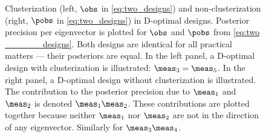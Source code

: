 \begin{figure}
  \caption{Clusterization (left, $\obs$ in \eqref{eq:two_designs})
    and non-clusterization (right, $\pobs$ in \eqref{eq:two_designs})
    in D-optimal designs. Posterior precision per eigenvector is
    plotted for $\obs$ and $\pobs$ from \eqref{eq:two
______designs}. Both designs are identical for all practical matters
    --- their posteriors are equal. In the left panel, a D-optimal
    design with clusterization is illustrated: $\meas_3 = \meas_5$. In
    the right panel, a D-optimal design without clusterization is
    illustrated. The contribution to the posterior precision due to
    $\meas_1$ and $\meas_2$ is denoted $\meas_1\meas_2$. These
    contributions are plotted together because neither $\meas_1$ nor
    $\meas_2$ are not in the direction of any eigenvector. Similarly
    for $\meas_3\meas_4$.}
  \label{fig:clusterization}
\end{figure}
